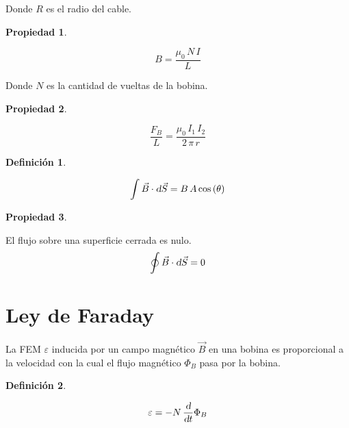 \documentclass[a5paper,12pt,twoside]{book}
\newtheorem{defn}{{Definición}}[chapter]
\newtheorem{prop}{{Propiedad}}[chapter]
\begin{document}
Donde $R$ es el radio del cable.

\begin{mdframed}[style=MyFrame1]
    \begin{prop}
    \end{prop}
    \begin{equation*}
        B = \frac{\mu_0 \, N \, I}{L}
    \end{equation*}
\end{mdframed}

Donde $N$ es la cantidad de vueltas de la bobina.

\begin{mdframed}[style=MyFrame1]
    \begin{prop}
    \end{prop}
    \begin{equation*}
        \dfrac{F_B}{L}=\frac{\mu_0 \, I_1 \, I_2}{2 \, \pi \, r}
    \end{equation*}
\end{mdframed}

\begin{mdframed}[style=MyFrame1]
    \begin{defn}
    \end{defn}
    \begin{equation*}
        \int \Vec{B} \cdot \textsl{d} \Vec{S} = B \, A \cos\left(\theta\right)
    \end{equation*}
\end{mdframed}

\begin{mdframed}[style=MyFrame1]
    \begin{prop}
    \end{prop}
    El flujo sobre una superficie cerrada es nulo.
    \begin{equation*}
        \oint \Vec{B} \cdot \textsl{d} \Vec{S} = 0
    \end{equation*}
\end{mdframed}


\section*{Ley de Faraday}

La FEM $\varepsilon$ inducida por un campo magnético $\Vec{B}$ en una bobina es proporcional a la velocidad con la cual el flujo magnético $\Phi_B$ pasa por la bobina.

\begin{mdframed}[style=MyFrame1]
    \begin{defn}
    \end{defn}
    \begin{equation*}
        \varepsilon = - N \, \frac{\textsl{d}}{\textsl{d} t} \Phi_B
    \end{equation*}
\end{mdframed}
\end{document}
